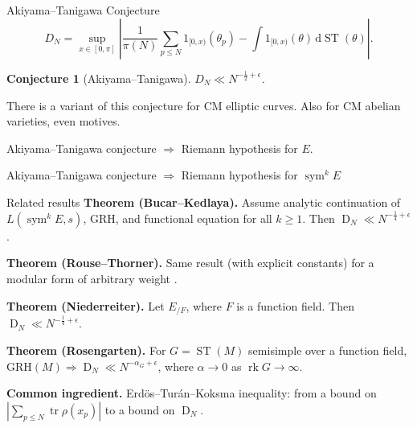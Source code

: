 \documentclass{beamer}
\DeclareMathOperator{\D}{D}
\DeclareMathOperator{\rk}{rk}
\DeclareMathOperator{\ST}{ST}
\DeclareMathOperator{\sym}{sym}
\DeclareMathOperator{\tr}{tr}
\newcommand{\dd}{\mathrm{d}}
\newtheorem{conjecture}{Conjecture}
\begin{document}
\begin{frame}{Akiyama--Tanigawa Conjecture}
\[
	D_N = \sup_{x\in [0,\pi]}\left| \frac{1}{\pi(N)} \sum_{p\leqslant N} 1_{[0,x)}(\theta_p) - \int 1_{[0,x)}(\theta) \, \dd\ST(\theta)\right| .
\]
\pause

\begin{conjecture}[Akiyama--Tanigawa]
$D_N \ll N^{-\frac 1 2 + \epsilon}$. 
\end{conjecture}
\pause

There is a variant of this conjecture for CM elliptic curves.
\pause
Also for CM abelian varieties, 
\pause
even motives.
\pause

\begin{theorem}
Akiyama--Tanigawa conjecture $\Rightarrow$ Riemann hypothesis for $E$.
\end{theorem}
\pause

\begin{theorem}[Mazur]
Akiyama--Tanigawa conjecture $\Rightarrow$ Riemann hypothesis for $\sym^k E$
\end{theorem}
\end{frame}



\begin{frame}{Related results}
\textbf{Theorem (Bucar--Kedlaya).}
Assume analytic continuation of $L(\sym^k E,s)$, GRH, and functional equation 
for all $k\geqslant 1$. Then $\D_N \ll N^{-\frac 1 4+\epsilon}$. 
\pause

\textbf{Theorem (Rouse--Thorner).}
Same result (with explicit constants) for a modular form of arbitrary weight	. 
\pause

\textbf{Theorem (Niederreiter).}
Let $E_{/F}$, where $F$ is a function field. Then 
$\D_N \ll N^{-\frac 1 4+\epsilon}$. 
\pause

\textbf{Theorem (Rosengarten).}
For $G = \ST(M)$ semisimple over a function field, 
$\mathrm{GRH}(M)\Rightarrow\D_N \ll N^{-\alpha_G+\epsilon}$, where $\alpha\to 0$ 
as $\rk G\to \infty$. 
\pause

\textbf{Common ingredient.}
Erd\"os--Tur\'an--Koksma inequality: from a bound on
$\left|\sum_{p\leqslant N} \tr \rho(x_p)\right|$ to a bound on $\D_N$.
\end{frame}
\end{document}
